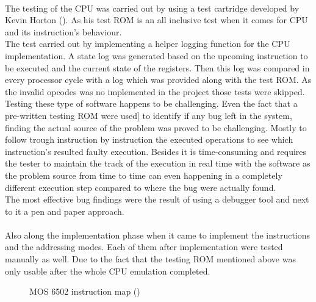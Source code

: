 \documentclass[]{report}
\begin{document}
\paragraph{ }
The testing of the CPU was carried out by using a test cartridge developed by Kevin Horton (\cite{NEST}). As his test ROM is an all inclusive test when it comes for CPU and its instruction's behaviour.
\\
The test carried out by implementing a helper logging function for the CPU implementation. A state log was generated based on the upcoming instruction to be executed and the current state of the registers. Then this log was compared in every processor cycle with a log which was provided along with the test ROM. 
As the invalid opcodes was no implemented in the project those tests were skipped.
\\
Testing these type of software happens to be challenging. Even the fact that a pre-written testing ROM were used] to identify if any bug left in the system, finding the actual source of the problem was proved to be challenging. Mostly to follow trough instruction by instruction the executed operations to see which instruction's resulted faulty execution. Besides it is time-consuming and requires the tester to maintain the track of the execution in real time with the software as the problem source from time to time can even happening in a completely different execution step compared to where the bug were actually found.
\\
The most effective bug findings were the result of using a debugger tool and next to it a pen and paper approach.
\paragraph{ }
Also along the implementation phase when it came to implement the instructions and the addressing modes.
Each of them after implementation were tested manually as well. Due to the fact that the testing ROM mentioned above was only usable after the whole CPU emulation completed.

\begin{figure}[h]
	\caption{\label{fig:my-label} MOS 6502 instruction map (\cite{TALK})}
\end{figure}
\clearpage
\end{document}
